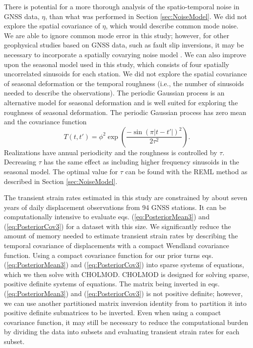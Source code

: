 \documentclass[extra,mreferee]{gji}
\begin{document}
There is potential for a more thorough analysis of the spatio-temporal
noise in GNSS data, $\eta$, than what was performed in Section
\ref{sec:NoiseModel}. We did not explore the spatial covariance of
$\eta$, which would describe common mode noise. We are able to ignore
common mode error in this study; however, for other geophysical
studies based on GNSS data, such as fault slip inversions, it may be
necessary to incorporate a spatially covarying noise model
\citep[e.g.,][]{Miyazaki2003}. We can also improve upon the seasonal
model used in this study, which consists of four spatially
uncorrelated sinusoids for each station. We did not explore the
spatial covariance of seasonal deformation or the temporal roughness
(i.e., the number of sinusoids needed to describe the observations).
The periodic Gaussian process \citep{Mackay1998} is an alternative
model for seasonal deformation and is well suited for exploring the
roughness of seasonal deformation.  The periodic Gaussian process has
zero mean and the covariance function
\begin{equation}\label{eq:Periodic}
T(t,t') = \phi^2 \exp\left(\frac{-\sin(\pi|t - t'|)^2}{2\tau^2}\right).
\end{equation}
Realizations have annual periodicity and the roughness is controlled
by $\tau$. Decreasing $\tau$ has the same effect as including higher
frequency sinusoids in the seasonal model. The optimal value for
$\tau$ can be found with the REML method as described in Section
\ref{sec:NoiseModel}.

The transient strain rates estimated in this study are constrained by
about seven years of daily displacement observations from 94 GNSS
stations. It can be computationally intensive to evaluate eqs.
(\ref{eq:PosteriorMean3}) and (\ref{eq:PosteriorCov3}) for a dataset
with this size. We significantly reduce the amount of memory needed to
estimate transient strain rates by describing the temporal covariance
of displacements with a compact Wendland covariance function. Using a
compact covariance function for our prior turns eqs.
(\ref{eq:PosteriorMean3}) and (\ref{eq:PosteriorCov3}) into sparse
systems of equations, which we then solve with CHOLMOD. CHOLMOD is
designed for solving sparse, positive definite systems of equations.
The matrix being inverted in eqs. (\ref{eq:PosteriorMean3}) and
(\ref{eq:PosteriorCov3}) is not positive definite; however, we can use
another partitioned matrix inversion identity from \citet{Press2007}
to partition it into positive definite submatrices to be inverted.
Even when using a compact covariance function, it may still be
necessary to reduce the computational burden by dividing the data into
subsets and evaluating transient strain rates for each subset.
\end{document}
